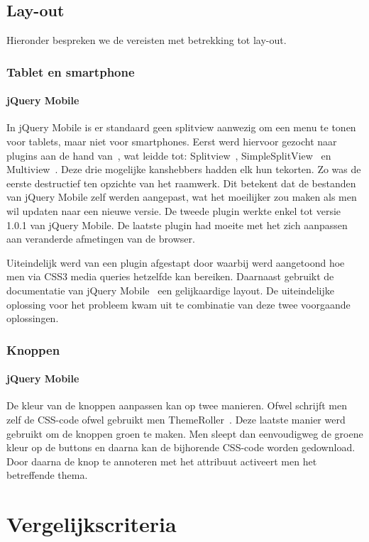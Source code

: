 \subsection{Lay-out}
Hieronder bespreken we de vereisten met betrekking tot lay-out.

\subsubsection{Tablet en smartphone}

\paragraph{jQuery Mobile} 
In jQuery Mobile is er standaard geen splitview aanwezig om een menu te tonen voor tablets, maar niet voor smartphones. Eerst werd hiervoor gezocht naar plugins aan de hand van~\cite{Deering2012}, wat leidde tot: Splitview~\cite{Rahman2013}, SimpleSplitView~\cite{Yared2013} en Multiview~\cite{Franck2012}. Deze drie mogelijke kanshebbers hadden elk hun tekorten. Zo was de eerste destructief ten opzichte van het raamwerk. Dit betekent dat de bestanden van jQuery Mobile zelf werden aangepast, wat het moeilijker zou maken als men wil updaten naar een nieuwe versie. De tweede plugin werkte enkel tot versie 1.0.1 van jQuery Mobile. De laatste plugin had moeite met het zich  aanpassen aan veranderde afmetingen van de browser. 

Uiteindelijk werd van een plugin afgestapt door \cite{Hadlock2012} waarbij werd aangetoond hoe men via CSS3 media queries hetzelfde kan bereiken. Daarnaast gebruikt de documentatie van jQuery Mobile~\cite{JQuery2012b} een gelijkaardige layout. De uiteindelijke oplossing voor het probleem kwam uit te combinatie van deze twee voorgaande oplossingen.

\subsubsection{Knoppen}

\paragraph{jQuery Mobile} De kleur van de knoppen aanpassen kan op twee manieren. Ofwel schrijft men zelf de CSS-code ofwel gebruikt men ThemeRoller~\cite{JQuery2012c}. Deze laatste manier werd gebruikt om de knoppen groen te maken. Men sleept dan eenvoudigweg de groene kleur op de buttons en daarna kan de bijhorende CSS-code worden gedownload. Door daarna de knop te annoteren met het  attribuut activeert men het betreffende thema.


\section{Vergelijkscriteria}
\label{sec:evaluatie-criteria}
